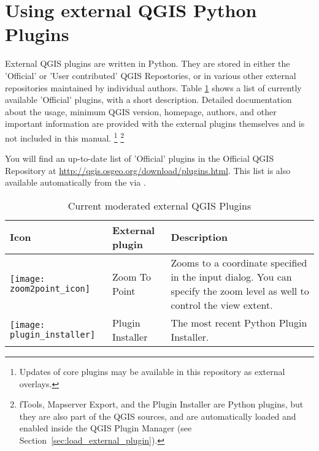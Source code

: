 
\section{Using external QGIS Python Plugins}\label{sec:external_plugins}


External QGIS plugins are written in Python. They are stored in either 
the 'Official' or 'User contributed' QGIS Repostories, or in various other external 
repositories maintained by individual authors. 
Table \ref{tab:external_plugins} shows a list of currently available 'Official' 
plugins, with a short description.
Detailed documentation about the usage, minimum QGIS version, homepage, authors, 
and other important information are provided with the external plugins themselves 
and is not included in this manual.
\footnote{Updates of core plugins may be 
available in this repository as external overlays.} 
\footnote{fTools, Mapserver Export, and the Plugin Installer are Python plugins, 
but they are also part of the QGIS sources, and are automatically loaded and 
enabled inside the QGIS Plugin Manager (see Section~\ref{sec:load_external_plugin}).}

You will find an up-to-date list of 'Official' plugins in the Official QGIS 
Repository at \url{http://qgis.osgeo.org/download/plugins.html}. This list is 
also available automatically from the  
via .

\begin{table}[H]
\centering
\caption{Current moderated external QGIS Plugins}\label{tab:external_plugins}\medskip
\small
 \begin{tabular}{|l|l|p{4in}|}
\hline \textbf{Icon} & \textbf{External plugin} & \textbf{Description}\\
\hline
\texttt{[image: zoom2point\_icon]}
 & Zoom To Point \index{plugins!Zoom To Point} & Zooms to a coordinate 
  specified in the input dialog. You can specify the zoom level as well to 
  control the view extent.\\
\hline
\texttt{[image: plugin\_installer]}
 & Plugin Installer \index{plugins!Plugin Installer} & The most recent Python Plugin Installer.\\
\hline
\end{tabular}
\end{table}

